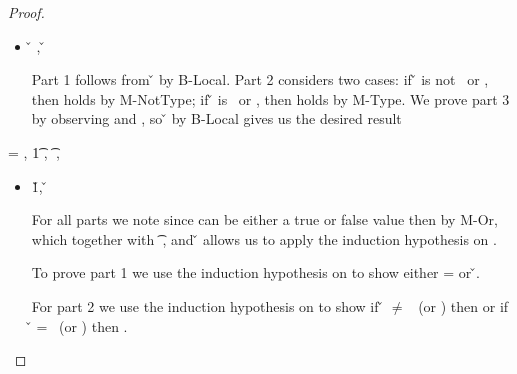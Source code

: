 \begin{lemma}
\begin{enumerate}
\begin{proof}
\begin{case}[T-Local]
\begin{itemize}
  \item[]
\begin{subcase}[B-Local]
{ \inopenv {\openv{}} {\x{}} {\v{}} },
{ \opsem {\openv{}} {\x{}} {\v{}} }

Part 1 follows from \inopenv{\openv{}}{\x{}} {\v{}} by B-Local.
Part 2 considers two cases: if \v{} is not \false\ or \nil, then 
\satisfies{\openv{}}{\notprop{\falsy}{\x{}}} holds by M-NotType; if \v{} is \false\ or \nil, then 
\satisfies{\openv{}}{\isprop{\falsy}{\x{}}} holds by M-Type.
We prove part 3 by observing
\inpropenv{\propenv{}}{\isprop{\t{}}{\x{}}}
and
\satisfies{\openv{}}{\propenv{}},
so
{ \inopenv {\openv{}} {\x{}} {\v{}} }
by B-Local
gives us the desired result
\end{subcase}
\end{itemize}

\end{case}

\begin{case}[T-Do]
\e{} = { {}},
  \judgement {\propenv{}} 
             { {\t1}} 
             { {}} 
             {},
           { {\t{}}} 
           {\filterset {\thenprop {\prop{}}} {\elseprop {\prop{}}}} 
           {\object{}},

\begin{itemize}
  \item[] \begin{subcase}[B-Do]
  \opsem {\openv{}} {} {\v{1}},
  \opsem {\openv{}} {} {\v{}}

For all parts we note 
    since {} can be either a true or false value
    then
    {}
    by M-Or,
    which together with 
           { {\t{}}} 
           {\filterset {\thenprop {\prop{}}} {\elseprop {\prop{}}}} 
           {\object{}},
    and
  \opsem {\openv{}} {} {\v{}}
    allows us to apply the induction hypothesis on .

To prove part 1 we use the induction hypothesis on 
to show either \object{} = \emptyobject{} 
or \inopenv {\openv{}} {\object{}} {\v{}}.

For part 2 we use the induction hypothesis on 
to show if \v{} $\not=$ \false\ (or \nil) then
        {\satisfies{\openv{}}{\thenprop{\prop{}}}}
        or
  if \v{} = \false\ (or \nil) then
        {\satisfies{\openv{}}{\elseprop{\prop{}}}}.


\end{subcase}
\end{itemize}
\end{case}
\end{proof}
\end{enumerate}
\end{lemma}
